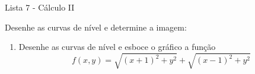\documentclass[11pt,a4paper]{article}
\begin{document}
	\begin{center}
		\Large Lista 7 - Cálculo II
	\end{center}
	
Desenhe as curvas de nível e determine a imagem:	
	
	\begin{enumerate}
		
		
		
Desenhe as curvas de nível e determine a imagem:
			\begin{enumerate}
			\item $f(x,y) = x - 2y$				
				\item $f(x,y) = \displaystyle\frac{x - y}{x + y}$
				\item $\displaystyle\frac{x^2}{x^2 + y^2}$
				\item $3x^3 - 4xy + y^2$
				\item $f(x,y) = x^2 - y^2$
				\item $z = \displaystyle\frac{y}{x - 2} $
				\item $z = \displaystyle\frac{x}{y - 1} $
				\item $z = \displaystyle\frac{xy}{x^2 + y^2} $
			\end{enumerate}
			
			\item Desenhe as curvas de nível e esboce o gráfico a função
			$$f(x,y) = \sqrt{(x+1)^2 + y^2} + \sqrt{(x-1)^2 + y^2}$$			
			

\end{enumerate}
\end{document}
